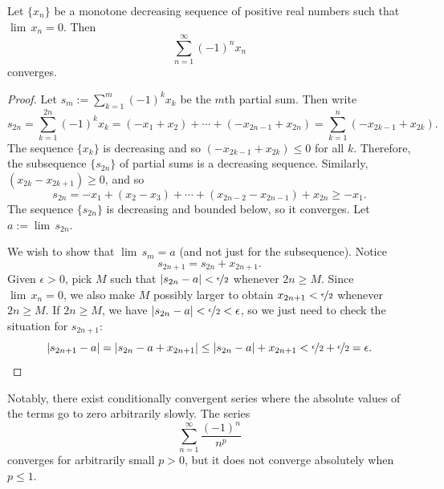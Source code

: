\begin{prop}
Let $\{ x_n \}$ be a monotone decreasing sequence of positive real numbers such
that $\lim\, x_n = 0$.  Then
\begin{equation*}
\sum_{n=1}^\infty {(-1)}^n x_n
\end{equation*}
converges.
\end{prop}

\begin{proof}
Let $s_m := \sum_{k=1}^m {(-1)}^k x_k$ be the $m$th partial sum.  Then write
\begin{equation*}
s_{2n} =
\sum_{k=1}^{2n} {(-1)}^k x_k
=
(-x_1 + x_2) + \cdots + (-x_{2n-1} + x_{2n})
=
\sum_{k=1}^{n} (-x_{2k-1} + x_{2k}) .
\end{equation*}
The sequence $\{ x_k \}$ is decreasing and so $(-x_{2k-1}+x_{2k}) \leq 0$
for all $k$.
Therefore, the subsequence $\{ s_{2n} \}$ of partial sums
is a decreasing sequence.  Similarly, $(x_{2k}-x_{2k+1}) \geq 0$, and so
\begin{equation*}
s_{2n} = - x_1 + ( x_2 - x_3 ) + \cdots + ( x_{2n-2} - x_{2n-1} ) + x_{2n}
\geq -x_1 .
\end{equation*}
The sequence $\{ s_{2n} \}$ is decreasing and bounded below, so it converges.
Let $a := \lim\, s_{2n}$.

We wish to show that $\lim\, s_m = a$ (and not just for the subsequence).
Notice
\begin{equation*}
s_{2n+1} = s_{2n} + x_{2n+1} .
\end{equation*}
Given $\epsilon > 0$, pick $M$ such that $\left\lvert {s_{2n}-a} \right\rvert <
\nicefrac{\epsilon}{2}$ whenever $2n \geq M$.
Since $\lim\, x_n = 0$, we also
make $M$ possibly larger
to obtain
$x_{2n+1} < \nicefrac{\epsilon}{2}$ whenever $2n \geq M$.  
If $2n \geq M$, we have
$\left\lvert {s_{2n}-a} \right\rvert < \nicefrac{\epsilon}{2} < \epsilon$, so we just need
to check the situation for $s_{2n+1}$:
\begin{equation*}
\left\lvert {s_{2n+1}-a} \right\rvert = 
\left\lvert {s_{2n}-a + x_{2n+1}} \right\rvert \leq
\left\lvert {s_{2n}-a} \right\rvert + x_{2n+1} < 
\nicefrac{\epsilon}{2}+ \nicefrac{\epsilon}{2} = \epsilon .  \qedhere
\end{equation*}
\end{proof}

Notably, there exist conditionally convergent series
where the absolute values of the terms go to zero arbitrarily slowly.
The series
\begin{equation*}
\sum_{n=1}^\infty \frac{{(-1)}^n}{n^p}
\end{equation*}
converges for arbitrarily small $p > 0$, but it does not converge
absolutely when $p \leq 1$.


